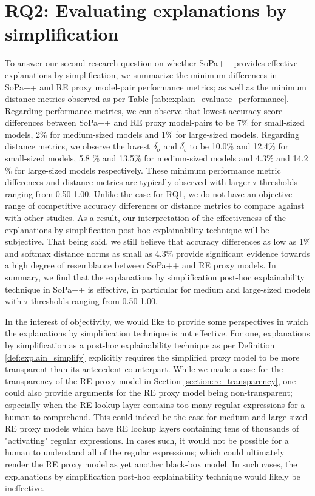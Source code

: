 \section{RQ2: Evaluating explanations by simplification}

To answer our second research question on whether SoPa++ provides effective
explanations by simplification, we summarize the minimum differences in SoPa++
and RE proxy model-pair performance metrics; as well as the minimum distance
metrics observed as per Table \ref{tab:explain_evaluate_performance}. Regarding
performance metrics, we can observe that lowest accuracy score differences
between SoPa++ and RE proxy model-pairs to be 7$\%$ for small-sized models, 2$\%$
for medium-sized models and 1$\%$ for large-sized models. Regarding distance
metrics, we observe the lowest $\overline{\delta_{\sigma}}$ and
$\overline{\delta_{b}}$ to be 10.0$\%$ and 12.4$\%$ for small-sized models, 5.8
$\%$ and 13.5$\%$ for medium-sized models and 4.3$\%$ and 14.2$\%$ for
large-sized models respectively. These minimum performance metric differences
and distance metrics are typically observed with larger $\tau$-thresholds
ranging from 0.50-1.00. Unlike the case for RQ1, we do not have an objective
range of competitive accuracy differences or distance metrics to compare against
with other studies. As a result, our interpretation of the effectiveness of the
explanations by simplification post-hoc explainability technique will be
subjective. That being said, we still believe that accuracy differences as low
as 1$\%$ and softmax distance norms as small as 4.3$\%$ provide significant
evidence towards a high degree of resemblance between SoPa++ and RE proxy
models. In summary, we find that the explanations by simplification post-hoc
explainability technique in SoPa++ is effective, in particular for medium and
large-sized models with $\tau$-thresholds ranging from 0.50-1.00.

In the interest of objectivity, we would like to provide some perspectives in
which the explanations by simplification technique is not effective. For one,
explanations by simplification as a post-hoc explainability technique as per
Definition \ref{def:explain_simplify} explicitly requires the simplified proxy
model to be more transparent than its antecedent counterpart. While we made a
case for the transparency of the RE proxy model in Section
\ref{section:re_transparency}, one could also provide arguments for the RE proxy
model being non-transparent; especially when the RE lookup layer contains too
many regular expressions for a human to comprehend. This could indeed be the
case for medium and large-sized RE proxy models which have RE lookup layers
containing tens of thousands of "activating" regular expressions. In cases such,
it would not be possible for a human to understand all of the regular
expressions; which could ultimately render the RE proxy model as yet another
black-box model. In such cases, the explanations by simplification post-hoc
explainability technique would likely be ineffective.

